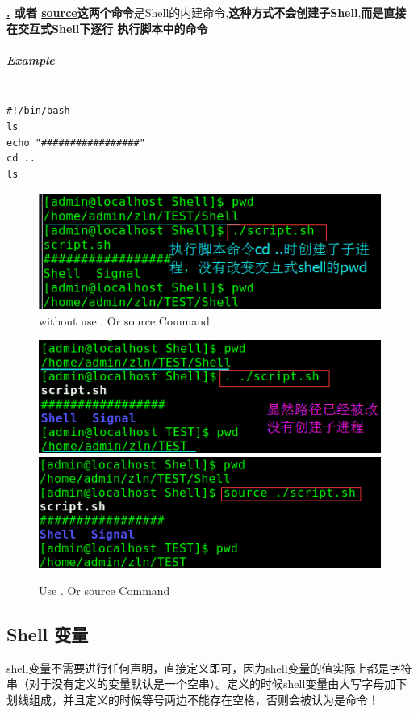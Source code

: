 \documentclass[UTF8,a4paper,12pt]{ctexbook}
\begin{document}
				 \textbf{\underline{.} 或者 \underline{source}这两个命令}是Shell的内建命令,\textbf{这种方式不会创建子Shell},\textbf{而是直接在交互式Shell下逐行 执行脚本中的命令}
				 
				 \subparagraph{Example}
					 \begin{lstlisting}[frame=L,xleftmargin=.06\textwidth]

#!/bin/bash
ls
echo "#################"
cd ..
ls
					 \end{lstlisting}
					 \begin{figure}[h]
					 	\centering
					 	\includegraphics[scale = 0.5]{SourceExample.png}
					 	\caption{without use . Or source Command}
					 \end{figure}
					 \begin{figure}[h]
					 	\begin{center}
					 		\includegraphics[scale = 0.5]{SourceExample1.png}
					 		\includegraphics[scale = 0.5]{SourceExample2.png}
					 	\end{center}
					 	\caption{Use . Or source Command}
					 \end{figure}
		 \subsection{Shell 变量}
			 shell变量不需要进行任何声明，直接定义即可，因为shell变量的值实际上都是字符串（对于没有定义的变量默认是一个空串）。定义的时候shell变量由大写字母加下划线组成，并且定义的时候等号两边不能存在空格，否则会被认为是命令！
			 
\end{document}
